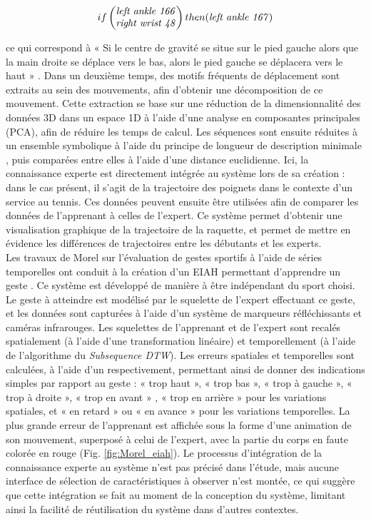\[ if
  \begin{pmatrix}
  \text{\textit{left ankle 166}} \\
  \text{\textit{right wrist 48}}
 \end{pmatrix}
 then (\text{\textit{left ankle 167}})\]

ce qui correspond à « Si le centre de gravité se situe sur le pied gauche alors que la main droite se déplace vers le bas, alors le pied gauche se déplacera vers le haut » . Dans un deuxième temps, des motifs fréquents de déplacement sont extraits au sein des mouvements, afin d'obtenir une décomposition de ce mouvement. Cette extraction se base sur une réduction de la dimensionnalité des données 3D dans un espace 1D à l'aide d'une analyse en composantes principales (PCA), afin de réduire les temps de calcul. Les séquences sont ensuite réduites à un ensemble symbolique à l'aide du principe de longueur de description minimale \parencite{Rissanen1998SCi}, puis comparées entre elles à l'aide d'une distance euclidienne. Ici, la connaissance experte est directement intégrée au système lors de sa création : dans le cas présent, il s'agit de la trajectoire des poignets dans le contexte d'un service au tennis. Ces données peuvent ensuite être utilisées afin de comparer les données de l'apprenant à celles de l'expert. Ce système permet d'obtenir une visualisation graphique de la trajectoire de la raquette, et permet de mettre en évidence les différences de trajectoires entre les débutants et les experts.\\

Les travaux de Morel sur l'évaluation de gestes sportifs à l'aide de séries temporelles ont conduit à la création d'un EIAH permettant d'apprendre un geste \parencite{Morel2017Mts}. Ce système est développé de manière à être indépendant du sport choisi. Le geste à atteindre est modélisé par le squelette de l'expert effectuant ce geste, et les données sont capturées à l'aide d'un système de marqueurs réfléchissants et caméras infrarouges. Les squelettes de l'apprenant et de l'expert sont recalés spatialement (à l'aide d'une transformation linéaire) et temporellement (à l'aide de l'algorithme du \textit{Subsequence DTW}). Les erreurs spatiales et temporelles sont calculées, à l'aide d'un respectivement, permettant ainsi de donner des indications simples par rapport au geste : « trop haut », « trop bas », « trop à gauche », « trop à droite », « trop en avant » , « trop en arrière » pour les variations spatiales, et « en retard » ou « en avance » pour les variations temporelles. La plus grande erreur de l'apprenant est affichée sous la forme d'une animation de son mouvement, superposé à celui de l'expert, avec la partie du corps en faute colorée en rouge (Fig. \ref{fig:Morel_eiah}). Le processus d'intégration de la connaissance experte au système n'est pas précisé dans l'étude, mais aucune interface de sélection de caractéristiques à observer n'est montée, ce qui suggère que cette intégration se fait au moment de la conception du système, limitant ainsi la facilité de réutilisation du système dans d'autres contextes.

